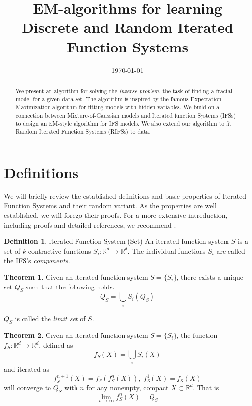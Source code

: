 \documentclass[10pt,a4paper,oneside]{article}
\title{EM-algorithms for learning Discrete and Random Iterated Function Systems}
\date{\today}
\theoremstyle{definition}
\newtheorem*{thm}{Theorem}
\newtheorem*{dfn}{Definition}
\begin{document}
\maketitle

\begin{abstract}
\noindent We present an algorithm for solving the \emph{inverse problem}, the task of finding a fractal model for a given data set. The algorithm is inspired by the famous Expectation Maximization algorithm for fitting models with hidden variables. We build on a connection between Mixture-of-Gaussian models and Iterated function Systems (IFSs) to design an EM-style algorithm for IFS models. We also extend our algorithm to fit Random Iterated Function Systems (RIFSs) to data.
\end{abstract}

\section*{Definitions}

We will briefly review the established definitions and basic properties of Iterated Function Systems and their random variant. As the properties are well established, we will forego their proofs. For a more extensive introduction, including proofs and detailed references, we recommend \cite{hutchinson2000deterministic}. 

\begin{dfn}{Iterated Function System (Set)}
An iterated function system $S$ is a set of $k$ contractive functions $S_i:{\mathbb R}^d \rightarrow {\mathbb R}^d$. The individual functions $S_i$ are called the IFS's \emph{components}.
\end{dfn}

\begin{thm}
Given an iterated function system $S = \{S_i\}$, there exists a unique set $Q_S$ such that the following holds:
\[
Q_S = \bigcup_i S_i(Q_S)
\]
\end{thm}

$Q_S$ is called the \emph{limit set} of $S$. 

\begin{thm}
Given an iterated function system $S = \{S_i\}$, the function $f_S:{\mathbb R}^d \rightarrow {\mathbb R^d}$, defined as 
\[
f_S(X) = \bigcup_i S_i(X)
\]
and iterated as
\[
f_S^{n+1}(X) = f_S(f_S^n(X)), \; f_S^{1}(X) = f_S(X)
\]
will converge to $Q_S$ with $n$ for any nonempty, compact $X \subset {\mathbb R}^d$. That is
\[
\lim_{n \rightarrow \infty} f_S^{n}(X) = Q_S
\]
\end{thm}
\end{document}
